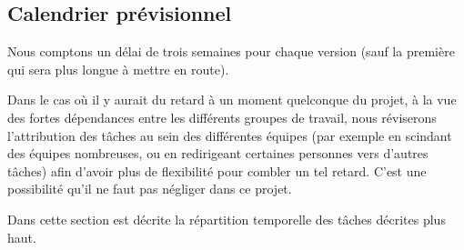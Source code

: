 \documentclass{article}
\begin{document}
\subsection{\label{calendrier}Calendrier prévisionnel}

Nous comptons un délai de trois semaines pour chaque version (sauf la première qui sera plus longue à mettre en route).

Dans le cas où il y aurait du retard à un moment quelconque du projet, à la vue des fortes dépendances entre les différents groupes de 
travail, nous réviserons l'attribution des tâches au sein des différentes équipes (par exemple en scindant des équipes nombreuses, ou en 
redirigeant certaines personnes vers d'autres tâches) afin d'avoir plus de flexibilité pour combler un tel retard. C'est une possibilité 
qu'il ne faut pas négliger dans ce projet.

Dans cette section est décrite la répartition temporelle des tâches décrites plus haut.


\newpage

\end{document}
